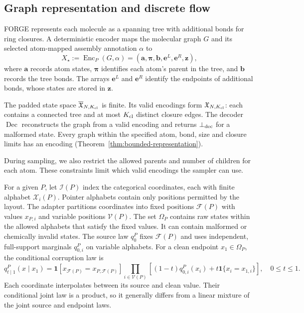 \documentclass{article}
\theoremstyle{definition}
\begin{document}
\subsection{Graph representation and discrete flow}
\label{sec:graph-flow}
FORGE represents each molecule as a spanning tree with additional bonds for ring closures.
A deterministic encoder maps the molecular graph $G$ and its selected atom-mapped
assembly annotation $\alpha$ to
\begin{equation}
    X_\star := \operatorname{Enc}_P(G,\alpha)
    = (\mathbf a,\boldsymbol\pi,\mathbf b,\mathbf e^L,\mathbf e^R,\mathbf z),
\end{equation}
where $\mathbf a$ records atom states, $\boldsymbol\pi$ identifies each atom's parent in the tree,
and $\mathbf b$ records the tree bonds. The arrays $\mathbf e^L$ and $\mathbf e^R$ identify the
endpoints of additional bonds, whose states are stored in $\mathbf z$.

The padded state space $\overline{\mathfrak X}_{N,K_{\rm cl}}$ is finite. Its valid encodings form
$\mathfrak X_{N,K_{\rm cl}}$: each contains a connected tree and at most $K_{\rm cl}$ distinct
closure edges. The decoder $\operatorname{Dec}$ reconstructs the graph from a valid encoding and
returns $\bot_{\rm dec}$ for a malformed state. Every graph within the specified atom, bond, size
and closure limits has an encoding (Theorem~\ref{thm:bounded-representation}).

During sampling, we also restrict the allowed parents and number of children for each atom.
These constraints limit which valid encodings the sampler can use.

For a given $P$, let $\mathcal I(P)$ index the categorical coordinates, each with finite alphabet
$\mathcal X_i(P)$. Pointer alphabets contain only positions permitted by the layout.
The adapter partitions coordinates into fixed positions $\mathcal F(P)$ with values $x_{P,i}$ and
variable positions $\mathcal V(P)$. The set $\Omega_P$ contains raw states within the allowed alphabets that satisfy the fixed
values. It can contain malformed or chemically invalid states. The source law $q_0^P$ fixes
$\mathcal F(P)$ and uses independent, full-support marginals $q_{0,i}^P$ on variable alphabets.
For a clean endpoint $x_1\in\Omega_P$, the conditional corruption law is
\begin{equation}
    q_{t\mid1}^P(x\mid x_1)
    =\mathbf 1[x_{\mathcal F(P)}=x_{P,\mathcal F(P)}]
    \prod_{i\in\mathcal V(P)}
    \left[(1-t)q_{0,i}^P(x_i)+t\mathbf 1\{x_i=x_{1,i}\}\right],
    \quad 0\leq t\leq1.
    \label{eq:conditional-path}
\end{equation}
Each coordinate interpolates between its source and clean value. Their conditional joint law is a
product, so it generally differs from a linear mixture of the joint source and endpoint laws.
\end{document}
